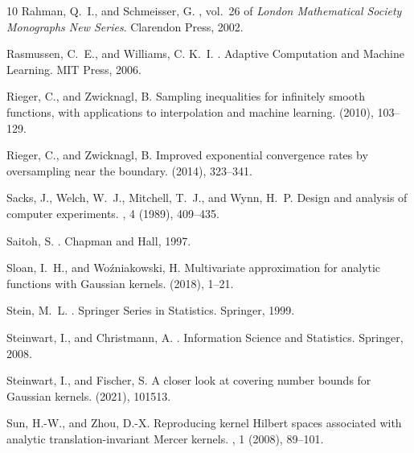 \documentclass{mcom-l}
\numberwithin{equation}{section}
\numberwithin{theorem}{section} %
\begin{document}
\begin{thebibliography}{10}
{\sc Rahman, Q.~I., and Schmeisser, G.}
, vol.~26 of {\em London
  Mathematical Society Monographs New Series}.
\newblock Clarendon Press, 2002.

{\sc Rasmussen, C.~E., and Williams, C. K.~I.}
.
\newblock Adaptive Computation and Machine Learning. MIT Press, 2006.

{\sc Rieger, C., and Zwicknagl, B.}
\newblock Sampling inequalities for infinitely smooth functions, with
  applications to interpolation and machine learning.
 (2010), 103--129.

{\sc Rieger, C., and Zwicknagl, B.}
\newblock Improved exponential convergence rates by oversampling near the
  boundary.
 (2014), 323--341.

{\sc Sacks, J., Welch, W.~J., Mitchell, T.~J., and Wynn, H.~P.}
\newblock Design and analysis of computer experiments.
, 4 (1989), 409--435.

{\sc Saitoh, S.}
.
\newblock Chapman and Hall, 1997.

{\sc Sloan, I.~H., and Wo{\'z}niakowski, H.}
\newblock Multivariate approximation for analytic functions with {G}aussian
  kernels.
 (2018), 1--21.

{\sc Stein, M.~L.}
.
\newblock Springer Series in Statistics. Springer, 1999.

{\sc Steinwart, I., and Christmann, A.}
.
\newblock Information Science and Statistics. Springer, 2008.

{\sc Steinwart, I., and Fischer, S.}
\newblock A closer look at covering number bounds for {G}aussian kernels.
 (2021), 101513.

{\sc Sun, H.-W., and Zhou, D.-X.}
\newblock Reproducing kernel {H}ilbert spaces associated with analytic
  translation-invariant {M}ercer kernels.
, 1 (2008),
  89--101.


\end{thebibliography}
\end{document}
